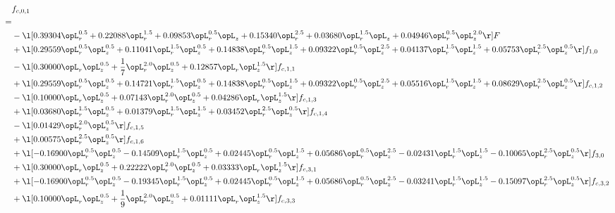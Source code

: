 \begin{alignat}{2} 
\label{eq:f_01_1} 
& f_{c,0,1} \nonumber \\ 
 = \\ 
& - \l[  0.39304 \opL_r^{0.5} +  0.22088 \opL_r^{1.5} +  0.09853 \opL_r^{0.5} \opL_z +  0.15340 \opL_r^{2.5} +  0.03680 \opL_r^{1.5} \opL_z +  0.04946 \opL_r^{0.5} \opL_z^{2.0}  \r] F \nonumber \\ 
& + \l[  0.29559 \opL_r^{0.5} \opL_z^{0.5} +  0.11041 \opL_r^{1.5} \opL_z^{0.5} +  0.14838 \opL_r^{0.5} \opL_z^{1.5} +  0.09322 \opL_r^{0.5} \opL_z^{2.5} +  0.04137 \opL_r^{1.5} \opL_z^{1.5} +  0.05753 \opL_r^{2.5} \opL_z^{0.5}  \r] f_{1,0} \nonumber \\ 
& - \l[  0.30000 \opL_r \opL_z^{0.5} + \frac{1}{7} \opL_r^{2.0} \opL_z^{0.5} +  0.12857 \opL_r \opL_z^{1.5}  \r] f_{c,1,1} \nonumber \\ 
& + \l[  0.29559 \opL_r^{0.5} \opL_z^{0.5} +  0.14721 \opL_r^{1.5} \opL_z^{0.5} +  0.14838 \opL_r^{0.5} \opL_z^{1.5} +  0.09322 \opL_r^{0.5} \opL_z^{2.5} +  0.05516 \opL_r^{1.5} \opL_z^{1.5} +  0.08629 \opL_r^{2.5} \opL_z^{0.5}  \r] f_{c,1,2} \nonumber \\ 
& - \l[  0.10000 \opL_r \opL_z^{0.5} +  0.07143 \opL_r^{2.0} \opL_z^{0.5} +  0.04286 \opL_r \opL_z^{1.5}  \r] f_{c,1,3} \nonumber \\ 
& + \l[  0.03680 \opL_r^{1.5} \opL_z^{0.5} +  0.01379 \opL_r^{1.5} \opL_z^{1.5} +  0.03452 \opL_r^{2.5} \opL_z^{0.5}  \r] f_{c,1,4} \nonumber \\ 
& - \l[  0.01429 \opL_r^{2.0} \opL_z^{0.5}  \r] f_{c,1,5} \nonumber \\ 
& + \l[  0.00575 \opL_r^{2.5} \opL_z^{0.5}  \r] f_{c,1,6} \nonumber \\ 
& + \l[  -0.16900 \opL_r^{0.5} \opL_z^{0.5}   -0.14509 \opL_r^{1.5} \opL_z^{0.5} +  0.02445 \opL_r^{0.5} \opL_z^{1.5} +  0.05686 \opL_r^{0.5} \opL_z^{2.5}   -0.02431 \opL_r^{1.5} \opL_z^{1.5}   -0.10065 \opL_r^{2.5} \opL_z^{0.5}  \r] f_{3,0} \nonumber \\ 
& + \l[  0.30000 \opL_r \opL_z^{0.5} +  0.22222 \opL_r^{2.0} \opL_z^{0.5} +  0.03333 \opL_r \opL_z^{1.5}  \r] f_{c,3,1} \nonumber \\ 
& + \l[  -0.16900 \opL_r^{0.5} \opL_z^{0.5}   -0.19345 \opL_r^{1.5} \opL_z^{0.5} +  0.02445 \opL_r^{0.5} \opL_z^{1.5} +  0.05686 \opL_r^{0.5} \opL_z^{2.5}   -0.03241 \opL_r^{1.5} \opL_z^{1.5}   -0.15097 \opL_r^{2.5} \opL_z^{0.5}  \r] f_{c,3,2} \nonumber \\ 
& + \l[  0.10000 \opL_r \opL_z^{0.5} + \frac{1}{9} \opL_r^{2.0} \opL_z^{0.5} +  0.01111 \opL_r \opL_z^{1.5}  \r] f_{c,3,3} \nonumber \\ 

\end{alignat}
